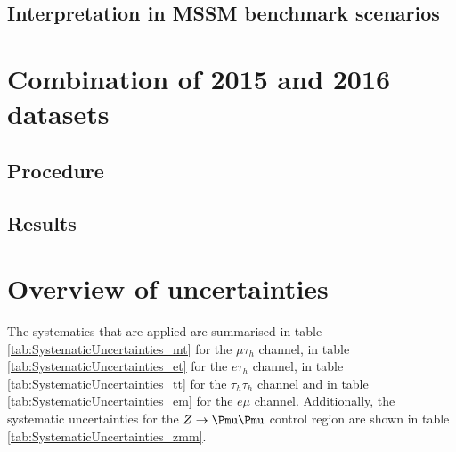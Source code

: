 \subsection{Interpretation in MSSM benchmark scenarios}
\label{sec:mssm_results_modeldep}

\section{Combination of 2015 and 2016 datasets}
\label{sec:mssm_combination}

\subsection{Procedure}
\label{sec:mssm_combination_procedure}

\subsection{Results}
\label{sec:mssm_combination_results}

\section{Overview of uncertainties}
\label{sec:mssm_uncs_overview}
The systematics that are applied are summarised in
table \ref{tab:SystematicUncertainties_mt} for the $\mu\tau_h$
channel, in table \ref{tab:SystematicUncertainties_et} for the $e\tau_h$ channel,
in table \ref{tab:SystematicUncertainties_tt} for the $\tau_h\tau_h$ channel and
in table \ref{tab:SystematicUncertainties_em} for the $e\mu$ channel. Additionally,
the systematic uncertainties for the $Z\rightarrow\mumu$ control region are shown
in table \ref{tab:SystematicUncertainties_zmm}.

